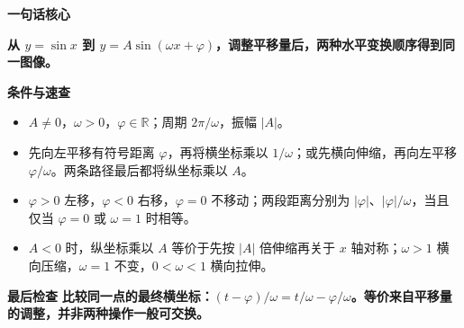 \begin{summarybox}
	\textbf{\textcolor{CSummary}{一句话核心}}

	\textbf{从 $y=\sin x$ 到 $y=A\sin(\omega x+\varphi)$，调整平移量后，两种水平变换顺序得到同一图像。}

	\medskip
	\textbf{\textcolor{CSummary}{条件与速查}}
	\begin{itemize}[leftmargin=*, itemsep=0.5em, topsep=0.4em]
		\item $A\neq0$，$\omega>0$，$\varphi\in\mathbb R$；周期 $2\pi/\omega$，振幅 $|A|$。
		\item 先向左平移有符号距离 $\varphi$，再将横坐标乘以 $1/\omega$；或先横向伸缩，再向左平移 $\varphi/\omega$。两条路径最后都将纵坐标乘以 $A$。
		\item $\varphi>0$ 左移，$\varphi<0$ 右移，$\varphi=0$ 不移动；两段距离分别为 $|\varphi|$、$|\varphi|/\omega$，当且仅当 $\varphi=0$ 或 $\omega=1$ 时相等。
		\item $A<0$ 时，纵坐标乘以 $A$ 等价于先按 $|A|$ 倍伸缩再关于 $x$ 轴对称；$\omega>1$ 横向压缩，$\omega=1$ 不变，$0<\omega<1$ 横向拉伸。
	\end{itemize}

	\textbf{\textcolor{CSummary}{最后检查}}
	\textbf{比较同一点的最终横坐标：$(t-\varphi)/\omega=t/\omega-\varphi/\omega$。等价来自平移量的调整，并非两种操作一般可交换。}
\end{summarybox}
